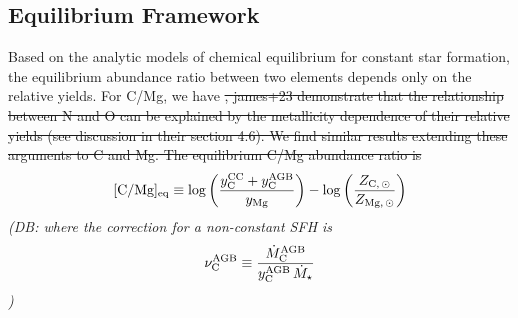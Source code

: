 \documentclass[fleqn,
usenatbib]{mnras}
\makeatletter
\newcommand{\agb}{AGB}
\newcommand{\cc}{CCSN}
\newcommand{\ia}{SN Ia}
\newcommand{\caah}{[C/Mg]-[Mg/H]}
\newcommand{\caafe}{[C/Mg]-[Mg/Fe]}
\newcommand{\Ycc}{{y_{\rm C}^{\rm CC}}}
\newcommand{\Ycagb}{{y_{\rm C}^{\rm AGB}}}
\newcommand{\noneqagb}{\nu_{\rm C}^{\rm AGB}}
\DeclareRobustCommand\citepos
  {\begingroup
   \let\NAT@nmfmt\NAT@posfmt%
   \NAT@swafalse\let\NAT@ctype\z@\NAT@partrue
   \@ifstar{\NAT@fulltrue\NAT@citetp}{\NAT@fullfalse\NAT@citetp}}
\let\NAT@orig@nmfmt\NAT@nmfmt
\def\NAT@posfmt#1{\NAT@orig@nmfmt{#1's}}
\newcommand{\dbstrike}[1]{{\color{Thistle} \sout{#1} }}
\newcommand{\dbnote}[1]{ {\color{Thistle} \textit{\small (DB: #1)}} }
\makeatother
\begin{document}
% 

\subsection{Equilibrium Framework}\label{sec:equilibrium}

Based on the \citepos{WAF17} analytic models of chemical equilibrium for constant star formation, the equilibrium abundance ratio between two elements depends only on the relative yields. For C/Mg, we have \dbstrike{ ,
{james+23} demonstrate that the relationship between N and O can be
explained by the metallicity dependence of their relative yields (see discussion
in their section 4.6).
We find similar results extending these arguments to C and Mg.
The equilibrium C/Mg abundance ratio is 
}
\begin{equation}\label{eq:equilibrium_yields}
    {\rm [C/Mg]_{eq}} \equiv \log \left(\frac{\Ycc + \Ycagb }{y_{\rm Mg}}\right) - \log \left(\frac{Z_{\rm C,\,\odot}}{Z_{\rm Mg,\,\odot}}\right)
\end{equation}
\dbnote{
where  the correction for a non-constant SFH is 
\begin{equation}
    \noneqagb \equiv \frac{\dot{M}_{\rm C}^{\rm AGB}}{\Ycagb\,\dot{M}_{\star}}
\end{equation}
}
\end{document}
